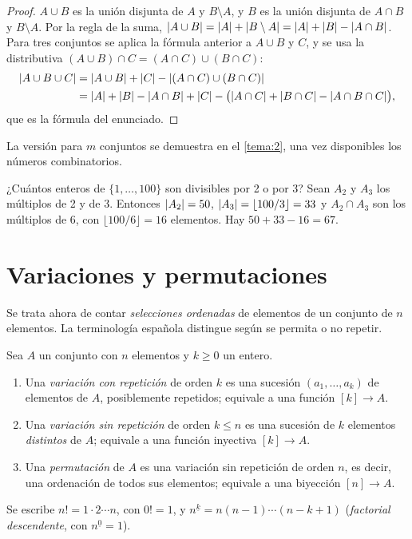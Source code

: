 \begin{proof}
$A\cup B$ es la unión disjunta de $A$ y $B\setminus A$, y $B$ es la unión disjunta de $A\cap B$ y $B\setminus A$. Por la regla de la suma, $\lvert A\cup B\rvert=\lvert A\rvert+\lvert B\setminus A\rvert=\lvert A\rvert+\lvert B\rvert-\lvert A\cap B\rvert$. Para tres conjuntos se aplica la fórmula anterior a $A\cup B$ y $C$, y se usa la distributiva $(A\cup B)\cap C=(A\cap C)\cup(B\cap C)$:
\begin{align*}
\lvert A\cup B\cup C\rvert&=\lvert A\cup B\rvert+\lvert C\rvert-\lvert(A\cap C)\cup(B\cap C)\rvert\\
&=\lvert A\rvert+\lvert B\rvert-\lvert A\cap B\rvert+\lvert C\rvert-\bigl(\lvert A\cap C\rvert+\lvert B\cap C\rvert-\lvert A\cap B\cap C\rvert\bigr),
\end{align*}
que es la fórmula del enunciado.
\end{proof}

La versión para $m$ conjuntos se demuestra en el \cref{tema:2}, una vez disponibles los números combinatorios.

\begin{ejemplo}\label{ej:t1-divisores}
¿Cuántos enteros de $\{1,\dots,100\}$ son divisibles por 2 o por 3? Sean $A_2$ y $A_3$ los múltiplos de 2 y de 3. Entonces $\lvert A_2\rvert=50$, $\lvert A_3\rvert=\lfloor 100/3\rfloor=33$ y $A_2\cap A_3$ son los múltiplos de 6, con $\lfloor100/6\rfloor=16$ elementos. Hay $50+33-16=67$.
\end{ejemplo}

\section{Variaciones y permutaciones}

Se trata ahora de contar \emph{selecciones ordenadas} de elementos de un conjunto de $n$ elementos. La terminología española distingue según se permita o no repetir.

\begin{definicion}
Sea $A$ un conjunto con $n$ elementos y $k\ge 0$ un entero.
\begin{enumerate}
  \item Una \emph{variación con repetición} de orden $k$ es una sucesión $(a_1,\dots,a_k)$ de elementos de $A$, posiblemente repetidos; equivale a una función $[k]\to A$.
  \item Una \emph{variación sin repetición} de orden $k\le n$ es una sucesión de $k$ elementos \emph{distintos} de $A$; equivale a una función inyectiva $[k]\to A$.
  \item Una \emph{permutación} de $A$ es una variación sin repetición de orden $n$, es decir, una ordenación de todos sus elementos; equivale a una biyección $[n]\to A$.
\end{enumerate}
Se escribe $n!=1\cdot2\cdots n$, con $0!=1$, y $n^{\underline{k}}=n(n-1)\cdots(n-k+1)$ (\emph{factorial descendente}, con $n^{\underline{0}}=1$).
\end{definicion}

